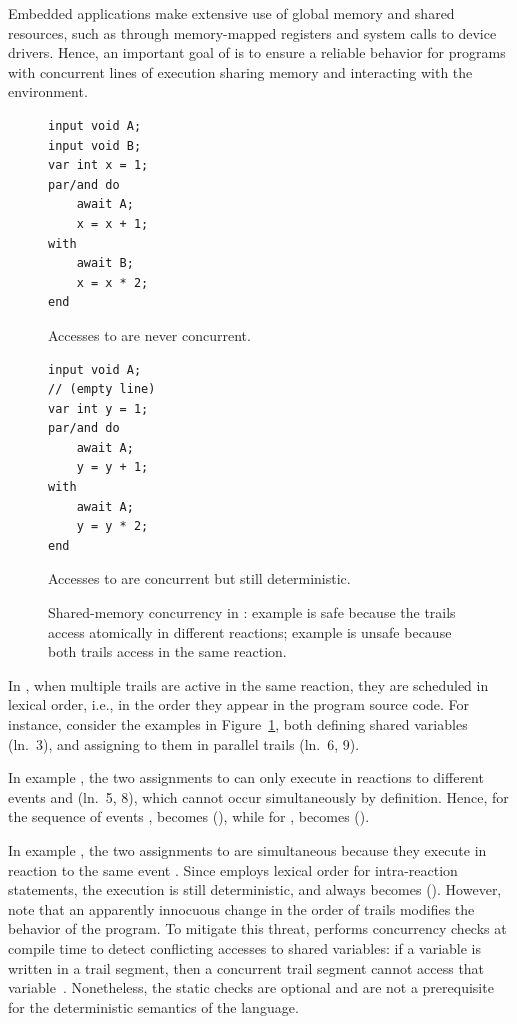 Embedded applications make extensive use of global memory and shared resources,
such as through memory-mapped registers and system calls to device drivers.
Hence, an important goal of \CEU is to ensure a reliable behavior for programs
with concurrent lines of execution sharing memory and interacting with the
environment.

\begin{figure}[h]
\begin{minipage}[h]{0.45\linewidth}
\begin{lstlisting}[numbers=right]
input void A;
input void B;
var int x = 1;
par/and do
    await A;
    x = x + 1;
with
    await B;
    x = x * 2;
end
\end{lstlisting}
\centering\small{\ax Accesses to  are never concurrent.}
\end{minipage}%
%
\begin{minipage}[h]{0.53\linewidth}
\begin{lstlisting}[xleftmargin=2em]
input void A;
// (empty line)
var int y = 1;
par/and do
    await A;
    y = y + 1;
with
    await A;
    y = y * 2;
end

\end{lstlisting}
\centering\small{\bx Accesses to  are concurrent but still deterministic.}
\end{minipage}%
\caption{Shared-memory concurrency in \CEU:
example \ax is safe because the trails access  atomically in different
reactions;
example \bx is unsafe because both trails access  in the same reaction.
\label{lst.shared}%
}
\end{figure}

In \CEU, when multiple trails are active in the same reaction, they are
scheduled in lexical order, i.e., in the order they appear in the program
source code.
%
For instance, consider the examples in Figure~\ref{lst.shared}, both
defining shared variables (ln.~3), and assigning to them in parallel trails
(ln.~6, 9).

In example \ax, the two assignments to  can only execute in
reactions to different events  and  (ln.~5, 8), which cannot
occur simultaneously by definition.
Hence, for the sequence of events ,  becomes 
(), while for ,  becomes 
().

In example \bx, the two assignments to  are simultaneous because
they execute in reaction to the same event .
Since \CEU employs lexical order for intra-reaction statements, the execution
is still deterministic, and  always becomes  ().
%
However, note that an apparently innocuous change in the order of trails
modifies the behavior of the program.
%
To mitigate this threat, \CEU performs concurrency checks at compile time to
detect conflicting accesses to shared variables:
if a variable is written in a trail segment, then a concurrent trail segment
cannot access that variable~\cite{ceu.sensys13}.
%
Nonetheless, the static checks are optional and are not a prerequisite for the
deterministic semantics of the language.

